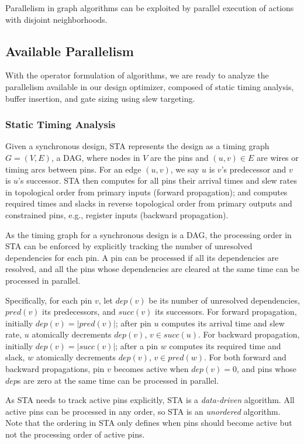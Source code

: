 Parallelism in graph algorithms can be exploited by parallel execution of actions with disjoint neighborhoods.

\subsection{Available Parallelism}
\label{sec:avail_parallelism}

With the operator formulation of algorithms, we are ready to analyze the parallelism available in our design optimizer, composed of static timing analysis, buffer insertion, and gate sizing using slew targeting.

\subsubsection{Static Timing Analysis}
\label{sec:sta_parallel}

Given a synchronous design, STA represents the design as a timing graph $G = (V, E)$, a DAG, where nodes in $V$ are the pins and $(u, v) \in E$ are wires or timing arcs between pins. For an edge $(u, v)$, we say $u$ is $v$'s predecessor and $v$ is $u$'s successor. STA then computes for all pins their arrival times and slew rates in topological order from primary inputs (forward propagation); and computes required times and slacks in reverse topological order from primary outputs and constrained pins, e.g., register inputs (backward propagation).

As the timing graph for a synchronous design is a DAG, the processing order in STA can be enforced by explicitly tracking the number of unresolved dependencies for each pin. A pin can be processed if all its dependencies are resolved, and all the pins whose dependencies are cleared at the same time can be processed in parallel.

Specifically, for each pin $v$, let $dep(v)$ be its number of unresolved dependencies, $pred(v)$ its predecessors, and $succ(v)$ its successors. For forward propagation, initially $dep(v) = |pred(v)|$; after pin $u$ computes its arrival time and slew rate, $u$ atomically decrements $dep(v)$, $v \in succ(u)$. For backward propagation, initially $dep(v) = |succ(v)|$; after a pin $w$ computes its required time and slack, $w$ atomically decrements $dep(v)$, $v \in pred(w)$. For both forward and backward propagations, pin $v$ becomes active when $dep(v) = 0$, and pins whose $dep$s are zero at the same time can be processed in parallel.

As STA needs to track active pins explicitly, STA is a {\em data-driven} algorithm. All active pins can be processed in any order, so STA is an {\em unordered} algorithm. Note that the ordering in STA only defines when pins should become active but not the processing order of active pins.


